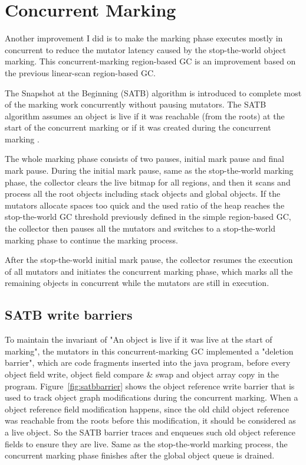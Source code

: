 \section{Concurrent Marking}
\label{sec:concmarkgc}

Another improvement I did is to make the marking phase executes mostly in concurrent to reduce the
mutator latency caused by the stop-the-world object marking.
This concurrent-marking region-based GC is an improvement based on the previous linear-scan region-based GC.

The Snapshot at the Beginning (SATB) algorithm \cite{yuasa1990real} is introduced to
complete most of the marking work concurrently without pausing mutators. The SATB algorithm assumes an object is live if it was reachable (from the roots)
at the start of the concurrent marking or if it was created during the concurrent marking \cite{yuasa1990real}.

The whole marking phase consists of two pauses, initial mark pause and final mark pause.
During the initial mark pause, same as the stop-the-world marking phase,
the collector clears the live bitmap for all regions,
and then it scans and process all the root objects including stack objects and global objects.
If the mutators allocate spaces too quick and the used ratio of the heap reaches
the stop-the-world GC threshold previously defined in the simple region-based GC, the
collector then pauses all the mutators and switches to a stop-the-world marking phase
to continue the marking process.

After the stop-the-world initial mark pause, the collector resumes the execution of all mutators and
initiates the concurrent marking phase, which marks all the remaining objects in concurrent
while the mutators are still in execution.

\subsection{SATB write barriers}

To maintain the invariant of "An object is live if it was live at the start of marking",
the mutators in this concurrent-marking GC implemented a "deletion barrier", which are code
fragments inserted into the java program, before every object field write, object field compare \& swap
and object array copy in the program. Figure~\ref{fig:satbbarrier} shows the object reference write barrier that is used
to track object graph modifications during the concurrent marking.
When a object reference field modification happens, since the old child object reference
was reachable from the roots before this modification, it should be considered as a live object.
So the SATB barrier traces and enqueues such old object reference fields to ensure they are live.
Same as the stop-the-world marking process, the concurrent marking phase finishes after
the global object queue is drained.

